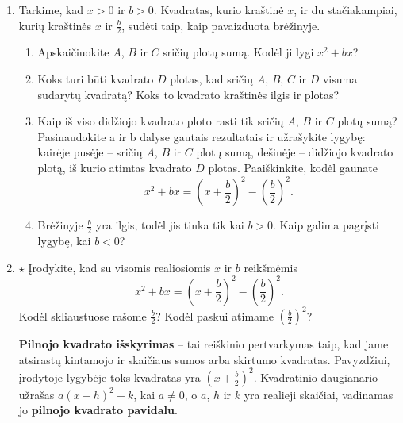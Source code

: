\documentclass[12pt,a4paper]{article}
\begin{document}
\begin{enumerate}
\begin{enumerate}
\end{enumerate}
\item Tarkime, kad $x>0$ ir $b>0$. Kvadratas, kurio kraštinė $x$, ir du stačiakampiai, kurių kraštinės $x$ ir $\frac{b}{2}$, sudėti taip, kaip pavaizduota brėžinyje.
\begin{center}
\end{center}
\begin{enumerate}
\item Apskaičiuokite $A$, $B$ ir $C$ sričių plotų sumą. Kodėl ji lygi $x^2+bx$?
\item Koks turi būti kvadrato $D$ plotas, kad sričių $A$, $B$, $C$ ir $D$ visuma sudarytų kvadratą? Koks to kvadrato kraštinės ilgis ir plotas?
\item Kaip iš viso didžiojo kvadrato ploto rasti tik sričių $A$, $B$ ir $C$ plotų sumą? Pasinaudokite a ir b dalyse gautais rezultatais ir užrašykite lygybę: kairėje pusėje -- sričių $A$, $B$ ir $C$ plotų sumą, dešinėje -- didžiojo kvadrato plotą, iš kurio atimtas kvadrato $D$ plotas. Paaiškinkite, kodėl gaunate
\[
x^2+bx=\left(x+\frac{b}{2}\right)^2-\left(\frac{b}{2}\right)^2.
\]
\item Brėžinyje $\frac{b}{2}$ yra ilgis, todėl jis tinka tik kai $b>0$. Kaip galima pagrįsti lygybę, kai $b<0$?
\end{enumerate}

\item $\star$ Įrodykite, kad su visomis realiosiomis $x$ ir $b$ reikšmėmis
\[
x^2+bx=\left(x+\frac{b}{2}\right)^2-\left(\frac{b}{2}\right)^2.
\]
Kodėl skliaustuose rašome $\frac{b}{2}$? Kodėl paskui atimame $\left(\frac{b}{2}\right)^2$?


\textbf{Pilnojo kvadrato išskyrimas} – tai reiškinio pertvarkymas taip, kad jame atsirastų kintamojo ir skaičiaus sumos arba skirtumo kvadratas. Pavyzdžiui, įrodytoje lygybėje toks kvadratas yra $\left(x+\frac{b}{2}\right)^2$. Kvadratinio daugianario užrašas $a(x-h)^2+k$, kai $a\ne 0$, o $a$, $h$ ir $k$ yra realieji skaičiai, vadinamas jo \textbf{pilnojo kvadrato pavidalu}.


\end{enumerate}
\end{document}
